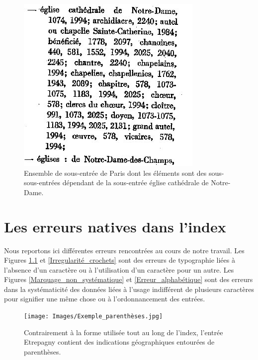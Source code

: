 \documentclass[a4paper,12pt,twoside]{book}
\begin{document}
	\begin{figure}
		\centering
		\includegraphics[width=\textwidth]{Images/Paris_sous_entrees_2.jpg}
		\caption{Ensemble de sous-entrée de \og Paris\fg{} dont les éléments sont des sous-sous-entrées dépendant de la sous-entrée \og église cathédrale de Notre-Dame\fg{}.}
		\label{Paris_sous_entrée_2}
	\end{figure}
	
	\chapter{Les erreurs natives dans l'index}
	
	Nous reportons ici différentes erreurs rencontrées au cours de notre travail. Les Figures \ref{Parenthèses_pour_crochets} et \ref{Irregularité_crochets} sont des erreurs de typographie liées à l'absence d'un caractère ou à l'utilisation d'un caractère pour un autre. Les Figures \ref{Marquage_non_systématique} et \ref{Erreur_alphabétique} sont des erreurs dans la systématicité des données liées à l'usage indifférent de plusieurs caractères pour signifier une même chose ou à l'ordonnancement des entrées.
	
	\pagebreak
	
	\begin{figure}
		\centering
		\texttt{[image: Images/Exemple\_parenthèses.jpg]}
		\caption{Contrairement à la forme utilisée tout au long de l'index, l'entrée \og Etrepagny\fg{} contient des indications géographiques entourées de parenthèses.}
		\label{Parenthèses_pour_crochets}
	\end{figure}
	
\end{document}
